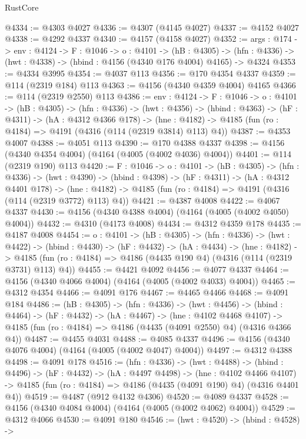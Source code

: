 \begin{lexlean}{RustCore}
\begin{coremodule}
@4334 := @4303 @4027
@4336 := @4307 (@4145 @4027)
@4337 := @4152 @4027
@4338 := @4292 @4337
@4340 := @4157 (@4158 @4027)
@4352 := {args : @174} ->
  {env : @4124} ->
  {F : @1046} ->
  {o : @4101} ->
  (hB : @4305) ->
  (hfn : @4336) -> (hwt : @4338) -> (hbind : @4156 (@4340 @176 @4004) @4165) -> @4324
@4353 := @4334 @3995
@4354 := @4037 @113
@4356 := @170 @4354 @4337
@4359 := @114 (@2319 @184) @113
@4363 := @4156 (@4340 @4359 @4004) @4165
@4366 := @114 (@2319 @2550) @113
@4386 := {env : @4124} ->
  {F : @1046} ->
  {o : @4101} ->
  (hB : @4305) ->
  (hfn : @4336) ->
  (hwt : @4356) ->
  (hbind : @4363) ->
  (hF : @4311) ->
  (hA : @4312 @4366 @178) ->
  (hne : @4182) -> @4185 (fun (ro : @4184) => @4191 (@4316 (@114 (@2319 @3814) @113) @4))
@4387 := @4353 @4007
@4388 := @4051 @113
@4390 := @170 @4388 @4337
@4398 := @4156 (@4340 @4354 @4004) (@4164 (@4005 (@4002 @4036) @4004))
@4401 := @114 (@2319 @190) @113
@4420 := {F : @1046} ->
  {o : @4101} ->
  (hB : @4305) ->
  (hfn : @4336) ->
  (hwt : @4390) ->
  (hbind : @4398) ->
  (hF : @4311) ->
  (hA : @4312 @4401 @178) ->
  (hne : @4182) -> @4185 (fun (ro : @4184) => @4191 (@4316 (@114 (@2319 @3772) @113) @4))
@4421 := @4387 @4008
@4422 := @4067 @4337
@4430 := @4156 (@4340 @4388 @4004) (@4164 (@4005 (@4002 @4050) @4004))
@4432 := @4310 (@4173 @4008)
@4434 := @4312 @4359 @178
@4435 := @4187 @4008
@4454 := {o : @4101} ->
  (hB : @4305) ->
  (hfn : @4336) ->
  (hwt : @4422) ->
  (hbind : @4430) ->
  (hF : @4432) ->
  (hA : @4434) ->
  (hne : @4182) ->
  @4185 (fun (ro : @4184) => @4186 (@4435 @190 @4) (@4316 (@114 (@2319 @3731) @113) @4))
@4455 := @4421 @4092
@4456 := @4077 @4337
@4464 := @4156 (@4340 @4066 @4004) (@4164 (@4005 (@4002 @4033) @4004))
@4465 := @4312 @4354
@4466 := @4091 @176
@4467 := @4465 @4466
@4468 := @4091 @184
@4486 := (hB : @4305) ->
  (hfn : @4336) ->
  (hwt : @4456) ->
  (hbind : @4464) ->
  (hF : @4432) ->
  (hA : @4467) ->
  (hne : @4102 @4468 @4107) ->
  @4185 (fun (ro : @4184) => @4186 (@4435 (@4091 @2550) @4) (@4316 @4366 @4))
@4487 := @4455 @4031
@4488 := @4085 @4337
@4496 := @4156 (@4340 @4076 @4004) (@4164 (@4005 (@4002 @4047) @4004))
@4497 := @4312 @4388
@4498 := @4091 @178
@4516 := (hfn : @4336) ->
  (hwt : @4488) ->
  (hbind : @4496) ->
  (hF : @4432) ->
  (hA : @4497 @4498) ->
  (hne : @4102 @4466 @4107) ->
  @4185 (fun (ro : @4184) => @4186 (@4435 (@4091 @190) @4) (@4316 @4401 @4))
@4519 := @4487 (@912 @4132 @4306)
@4520 := @4089 @4337
@4528 := @4156 (@4340 @4084 @4004) (@4164 (@4005 (@4002 @4062) @4004))
@4529 := @4312 @4066
@4530 := @4091 @180
@4546 := (hwt : @4520) ->
  (hbind : @4528) ->

\end{coremodule}
\end{lexlean}
